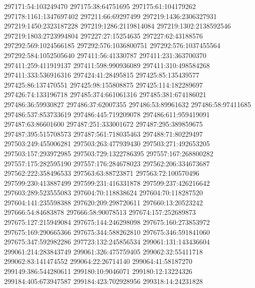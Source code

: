 297171:54:103249470
297175:38:64751695
297175:61:104179262
297178:1161:1347697402
297211:66:69297499
297219:1436:2306327931
297219:1450:2323187228
297219:1286:2119814084
297219:1302:2138592546
297219:1803:2723994804
297227:27:15254635
297227:62:43188576
297292:569:1024566185
297292:576:1036800751
297292:576:1037455564
297292:584:1052505640
297411:56:41330787
297411:231:363700370
297411:259:411919137
297411:598:990936089
297411:310:498584268
297411:333:536916316
297424:41:28495815
297425:85:135439577
297425:86:137470551
297425:98:155808875
297425:114:182289697
297426:74:133196718
297485:374:661061316
297485:381:674186021
297486:36:59930827
297486:37:62007355
297486:53:89961632
297486:58:97411685
297486:537:853733619
297486:445:719209078
297486:611:959419091
297487:63:86601600
297487:251:333001672
297487:295:389859675
297487:395:515708573
297487:561:718035463
297488:71:80229497
297503:249:455006281
297503:263:477939430
297503:271:492653205
297503:157:293972985
297503:729:1322786395
297557:167:268800282
297557:175:282595190
297557:176:284678023
297562:206:334673687
297562:222:358496533
297563:63:88723871
297563:72:100570496
297599:230:413887499
297599:231:416331878
297599:237:426216642
297603:289:523555083
297604:70:118838624
297604:70:118287520
297604:141:235598388
297620:209:298720611
297660:13:20523242
297666:54:84683878
297666:58:90078513
297674:157:252689873
297675:127:215949084
297675:144:246298098
297675:160:273853972
297675:169:290665366
297675:344:588262810
297675:346:591841060
297675:347:592982286
297723:132:245856534
299061:131:143436604
299061:214:283843749
299061:326:475759405
299062:32:55411718
299062:83:141474552
299064:22:26714140
299064:41:58187270
299149:386:544280611
299180:10:9046071
299180:12:13224326
299184:405:673947587
299184:423:702928956
299318:14:24231828
